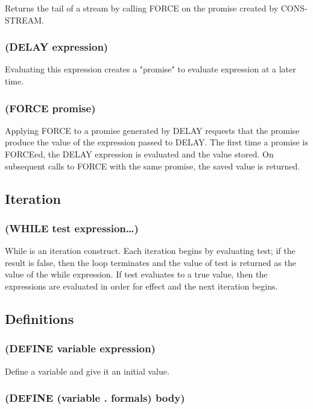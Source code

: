 \documentclass[11pt]{article}
\begin{document}
Returns the tail of a stream by calling FORCE on the promise created
by CONS-STREAM.
\subsubsection{(DELAY expression)}
\label{sec-4-8-6}

Evaluating this expression creates a "promise" to evaluate expression
at a later time.
\subsubsection{(FORCE promise)}
\label{sec-4-8-7}

Applying FORCE to a promise generated by DELAY requests that the
promise produce the value of the expression passed to DELAY.  The
first time a promise is FORCEed, the DELAY expression is evaluated
and the value stored.  On subsequent calls to FORCE with the same
promise, the saved value is returned.
\subsection{Iteration}
\label{sec-4-9}

\subsubsection{(WHILE test expression\ldots{})}
\label{sec-4-9-1}

While is an iteration construct.  Each iteration begins by evaluating
test; if the result is false, then the loop terminates and the value
of test is returned as the value of the while expression.  If test
evaluates to a true value, then the expressions are evaluated in
order for effect and the next iteration begins.
\subsection{Definitions}
\label{sec-4-10}

\subsubsection{(DEFINE variable expression)}
\label{sec-4-10-1}

Define a variable and give it an initial value.
\subsubsection{(DEFINE (variable . formals) body)}
\label{sec-4-10-2}
\end{document}
